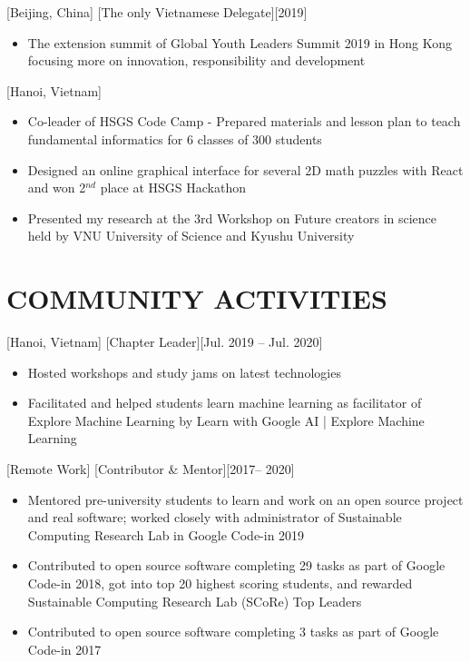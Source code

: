 \documentclass{article}
\begin{document}
[Beijing, China]
[The only Vietnamese Delegate][2019]

\begin{itemize}
\item The extension summit of Global Youth Leaders Summit 2019 in Hong Kong focusing more on
innovation, responsibility and development
\end{itemize}

[Hanoi, Vietnam]
\begin{itemize}
\item Co-leader of HSGS Code Camp - Prepared materials and lesson plan to teach fundamental informatics
for 6 classes of 300 students
\item Designed an online graphical interface for several 2D math puzzles with React and won 2$^{nd}$ place at
HSGS Hackathon
\item Presented my research at the 3rd Workshop on Future creators in science held by VNU University of
Science and Kyushu University
\end{itemize}


\section{COMMUNITY ACTIVITIES}

[Hanoi, Vietnam]
[Chapter Leader][Jul. 2019 – Jul. 2020]

\begin{itemize}
\item Hosted workshops and study jams on latest technologies
\item Facilitated and helped students learn machine learning as facilitator of Explore Machine Learning by
Learn with Google AI | Explore Machine Learning
\end{itemize}

[Remote Work]
[Contributor \& Mentor][2017– 2020]

\begin{itemize}
\item Mentored pre-university students to learn and work on an open source project and real software;
worked closely with administrator of Sustainable Computing Research Lab in Google Code-in 2019
\item Contributed to open source software completing 29 tasks as part of Google Code-in 2018, got into top
20 highest scoring students, and rewarded Sustainable Computing Research Lab (SCoRe) Top Leaders
\item Contributed to open source software completing 3 tasks as part of Google Code-in 2017
\end{itemize}
\end{document}
